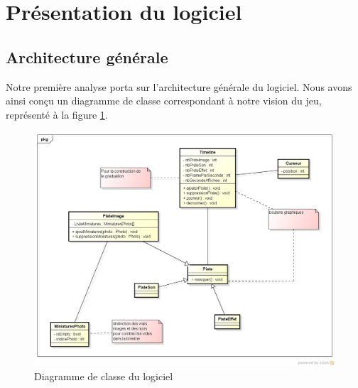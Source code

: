 \section{Présentation du logiciel}

\subsection{Architecture générale}
Notre première analyse porta sur l'architecture générale du logiciel. Nous avons ainsi conçu un diagramme de classe correspondant à notre vision du jeu, représenté à la figure \ref{classe}.

\begin{figure}[!h] 
\centerline{\includegraphics[scale=0.45]{img/diag_class_ex.png}}
   \caption{\label{étiquette} Diagramme de classe du logiciel}
\label{classe}
\end{figure}

